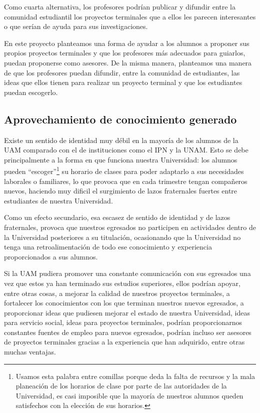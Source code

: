 \documentclass[11pt,letterpaper,titlepage]{article}
\begin{document}
Como cuarta alternativa, los profesores podr\'ian publicar y difundir entre la comunidad estudiantil los proyectos terminales que a ellos les parecen interesantes o que ser\'ian de ayuda para sus investigaciones.

En este proyecto planteamos una forma de ayudar a los alumnos a proponer sus propios proyectos terminales y que los profesores m\'as adecuados para guiarlos, puedan proponerse como asesores. De la misma manera, planteamos una manera de que los profesores puedan difundir, entre la comunidad de estudiantes, las ideas que ellos tienen para realizar un proyecto terminal y que los estudiantes puedan escogerlo.

\subsection{Aprovechamiento de conocimiento generado}
Existe un sentido de identidad muy d\'ebil en la mayor\'ia de los alumnos de la UAM comparado con el de instituciones como el IPN y la UNAM. Esto se debe principalmente a la forma en que funciona nuestra Universidad: los alumnos pueden ``escoger''\footnote{Usamos esta palabra entre comillas porque deda la falta de recursos y la mala planeaci\'on de los horarios de clase por parte de las autoridades de la Universidad, es casi imposible que la mayor\'ia de nuestros alumnos queden satisfechos con la elecci\'on de sus horarios.}  su horario de clases para poder adaptarlo a sus necesidades laborales o familiares, lo que provoca que en cada trimestre tengan compa\~neros nuevos, haciendo muy dificil el surgimiento de lazos fraternales fuertes entre estudiantes de nuestra Universidad.

Como un efecto secundario, esa escasez de sentido de identidad y de lazos fraternales, provoca que nuestros egresados no participen en actividades dentro de la Universidad posteriores a su titulaci\'on, ocasionando que la Universidad no tenga una retroalimentaci\'on de todo ese conocimiento y experiencia proporcionados a sus alumnos.

Si la UAM pudiera promover una constante comunicaci\'on con sus egresados una vez que estos ya han terminado sus estudios superiores, ellos podr\'ian apoyar, entre otras cosas, a mejorar la calidad de nuestros proyectos terminales, a fortalecer los conocimientos con los que terminan nuestros nuevos egresados, a proporcionar ideas que pudiesen mejorar el estado de nuestra Universidad, ideas para servicio social, ideas para proyectos terminales, podr\'ian proporcionarnos constantes fuentes de empleo para nuevos egresados, podr\'ian incluso ser asesores de proyectos terminales gracias a la experiencia que han adquirido, entre otras muchas ventajas.
\end{document}
